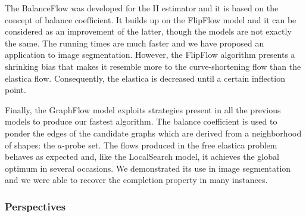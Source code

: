 The BalanceFlow was developed for the II estimator and it is based on the concept of balance coefficient. It builds up on the FlipFlow model and it can be considered as an improvement of the latter, though the models are not exactly the same. The running times are much faster and we have proposed an application to image segmentation. However, the FlipFlow algorithm presents a shrinking bias that makes it resemble more to the curve-shortening flow than the elastica flow. Consequently, the elastica is decreased until a certain inflection point.

Finally, the GraphFlow model exploits strategies present in all the previous models to produce our fastest algorithm. The balance coefficient is used to ponder the edges of the candidate graphs which are derived from a neighborhood of shapes: the $a$-probe set. The flows produced in the free elastica problem behaves as expected and, like the LocalSearch model, it achieves the global optimum in several occasions. We demonstrated its use in image segmentation and we were able to recover the completion property in many instances.

\subsubsection{Perspectives}

